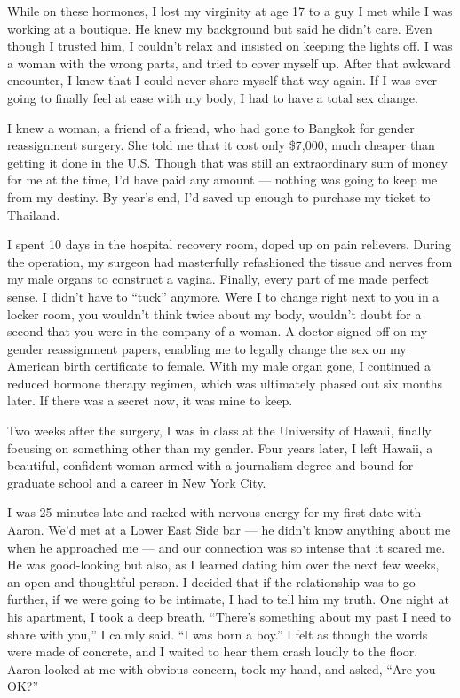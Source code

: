 \documentclass{article}
\begin{document}
While on these hormones, I lost my virginity at age 17 to a guy I met while I
was working at a boutique. He knew my background but said he didn't care. Even
though I trusted him, I couldn't relax and insisted on keeping the lights off.
I was a woman with the wrong parts, and tried to cover myself up. After that
awkward encounter, I knew that I could never share myself that way again. If I
was ever going to finally feel at ease with my body, I had to have a total sex
change.

I knew a woman, a friend of a friend, who had gone to Bangkok for gender
reassignment surgery. She told me that it cost only \$7,000, much cheaper than
getting it done in the U.S. Though that was still an extraordinary sum of money
for me at the time, I'd have paid any amount --- nothing was going to keep me
from my destiny. By year's end, I'd saved up enough to purchase my ticket to
Thailand.

I spent 10 days in the hospital recovery room, doped up on pain relievers.
During the operation, my surgeon had masterfully refashioned the tissue and
nerves from my male organs to construct a vagina. Finally, every part of me
made perfect sense. I didn't have to ``tuck'' anymore. Were I to change right
next to you in a locker room, you wouldn't think twice about my body, wouldn't
doubt for a second that you were in the company of a woman. A doctor signed off
on my gender reassignment papers, enabling me to legally change the sex on my
American birth certificate to female. With my male organ gone, I continued a
reduced hormone therapy regimen, which was ultimately phased out six months
later. If there was a secret now, it was mine to keep.

Two weeks after the surgery, I was in class at the University of Hawaii,
finally focusing on something other than my gender. Four years later, I left
Hawaii, a beautiful, confident woman armed with a journalism degree and bound
for graduate school and a career in New York City.

I was 25 minutes late and racked with nervous energy for my first date with
Aaron. We'd met at a Lower East Side bar --- he didn't know anything about me
when he approached me --- and our connection was so intense that it scared me.
He was good-looking but also, as I learned dating him over the next few weeks,
an open and thoughtful person. I decided that if the relationship was to go
further, if we were going to be intimate, I had to tell him my truth. One night
at his apartment, I took a deep breath. ``There's something about my past I
need to share with you,'' I calmly said. ``I was born a boy.'' I felt as though
the words were made of concrete, and I waited to hear them crash loudly to the
floor. Aaron looked at me with obvious concern, took my hand, and asked, ``Are
you OK?''
\end{document}
